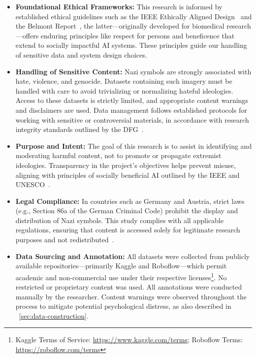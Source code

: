 \begin{itemize}
    \item \textbf{Foundational Ethical Frameworks:} This research is informed by established ethical guidelines such
    as the IEEE Ethically Aligned Design~\parencite{ieee2021ethics} and the Belmont Report~\parencite{belmont1979},
    the latter—originally developed for biomedical research—offers enduring principles like
    respect for persons and beneficence that extend to socially impactful AI systems. These principles guide our
    handling of sensitive data and system design choices.

    \item \textbf{Handling of Sensitive Content:} Nazi symbols are strongly associated with hate, violence, and
    genocide. Datasets containing such imagery must be handled with care to avoid trivializing or normalizing hateful
    ideologies. Access to these datasets is strictly limited, and appropriate content warnings and disclaimers are used.
    Data management follows established protocols for working with sensitive or controversial materials, in accordance
    with research integrity standards outlined by the \ac{DFG}~\parencite{dfg2022}.

    \item \textbf{Purpose and Intent:} The goal of this research is to assist in identifying and moderating harmful
    content, not to promote or propagate extremist ideologies. Transparency in the project's objectives helps
    prevent misuse, aligning with principles of socially beneficial AI outlined by the \ac{IEEE} and
    \ac{UNESCO}~\parencite{ieee2021ethics,unesco2021}.

    \item \textbf{Legal Compliance:} In countries such as Germany and Austria, strict laws (e.g., Section 86a of the
    German Criminal Code) prohibit the display and distribution of Nazi symbols. This study complies with all
    applicable regulations, ensuring that content is accessed solely for legitimate research purposes and not
    redistributed~\parencite{bundesregierung2023}.

    \item \textbf{Data Sourcing and Annotation:} All datasets were collected from publicly available
    repositories—primarily Kaggle and Roboflow—which permit academic and non-commercial use under their respective
    licenses\footnote{Kaggle Terms of Service: \url{https://www.kaggle.com/terms}; Roboflow Terms:
    \url{https://roboflow.com/terms}}. No restricted or proprietary content was used. All annotations were conducted
    manually by the researcher. Content warnings were observed throughout the process to mitigate potential
    psychological distress, as also described in ~\autoref{sec:data-construction}.


\end{itemize}
